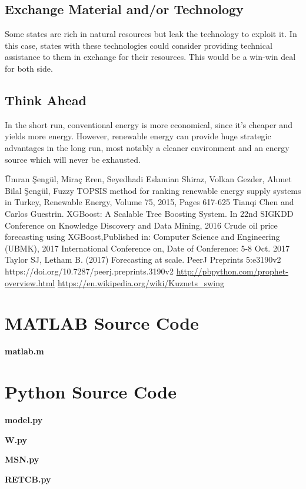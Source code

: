 \documentclass{mcmthesis}
\begin{document}
\subsection*{Exchange Material and/or Technology}
Some states are rich in natural resources but leak the technology to exploit it.
In this case, states with these technologies could consider providing technical assistance to them in exchange for their resources.
This would be a win-win deal for both side.

\subsection*{Think Ahead}
In the short run, conventional energy is more economical, since it's cheaper and yields more energy.
However, renewable energy can provide huge strategic advantages in the long run, most notably a cleaner environment and an energy source which will never be exhausted.


\newpage

\begin{thebibliography}{99}
 Ümran Şengül, Miraç Eren, Seyedhadi Eslamian Shiraz, Volkan Gezder, Ahmet Bilal Şengül, Fuzzy TOPSIS method for ranking renewable energy supply systems in Turkey, Renewable Energy, Volume 75, 2015, Pages 617-625
Tianqi Chen and Carlos Guestrin. XGBoost: A Scalable Tree Boosting System. In 22nd SIGKDD Conference on Knowledge Discovery and Data Mining, 2016
 Crude oil price forecasting using XGBoost,Published in: Computer Science and Engineering (UBMK), 2017 International Conference on, Date of Conference: 5-8 Oct. 2017
 Taylor SJ, Letham B. (2017) Forecasting at scale. PeerJ Preprints 5:e3190v2 https://doi.org/10.7287/peerj.preprints.3190v2
 \url{http://pbpython.com/prophet-overview.html}
 \url{https://en.wikipedia.org/wiki/Kuznets_swing}
\end{thebibliography}

\begin{appendices}

\section{MATLAB Source Code}
\textbf{matlab.m}


\section{Python Source Code}
\textbf{model.py}


\textbf{W.py}


\textbf{MSN.py}


\textbf{RETCB.py}




\end{appendices}
\end{document}
